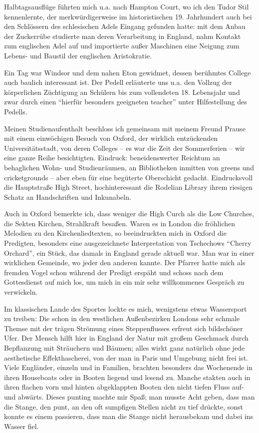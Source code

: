 \documentclass[a5paper,pagesize,10pt,twoside=true]{scrbook}
\begin{document}
Halbtagsausflüge führten mich u.a. nach Hampton Court, wo ich den Tudor Stil kennenlernte, der merkwürdigerweise im historistischen 19. Jahrhundert auch bei den Schlössern des schlesischen Adels Eingang gefunden hatte: mit dem Anbau der Zuckerrübe studierte man deren Verarbeitung in England, nahm Kontakt zum englischen Adel auf und importierte außer Maschinen eine Neigung zum Lebens- und Baustil der englischen Aristokratie.

Ein Tag war Windsor und dem nahen Eton gewidmet, dessen berühmtes College auch baulich interessant ist. Der Pedell erläuterte uns u.a. den Vollzug der körperlichen Züchtigung an Schülern bis zum vollendeten 18. Lebensjahr und zwar durch einen \enquote{hierfür besonders geeigneten teacher} unter Hilfestellung des Pedells.

Meinen Studienaufenthalt beschloss ich gemeinsam mit meinem Freund Prause mit einem einwöchigen Besuch von Oxford, der wirklich entzückenden Universitätsstadt, von deren Colleges -- es war die Zeit der Sommerferien -- wir eine ganze Reihe besichtigten. Eindruck: beneidenswerter Reichtum an behaglichen Wohn- und Studienräumen, an Bibliotheken inmitten von greens und cricketgrounds -- aber eben für eine begüterte Oberschicht gedacht. Eindrucksvoll die Hauptstraße High Street, hochinteressant die Rodelian Library ihrem riesigen Schatz an Handschriften und Inkunabeln.

Auch in Oxford bemerkte ich, dass weniger die High Curch als die Low Churches, die Sekten Kirchen, Strahlkraft besaßen. Waren es in London die fröhlichen Melodien zu den Kirchenliedtexten, so beeindruckten mich in Oxford die Predigten, besonders eine ausgezeichnete Interpretation von Tschechows \enquote{Cherry Orchard}, ein Stück, das damals in England gerade aktuell war. Man war in einer wirklichen Gemeinde, wo jeder den anderen kannte. Der Pfarrer hatte mich als fremden Vogel schon während der Predigt erspäht und schoss nach dem Gottesdienst auf mich los, um mich in ein mir sehr willkommenes Gespräch zu verwickeln.

Im klassischen Lande des Sportes lockte es mich, wenigstens etwas Wassersport zu treiben: Die schon in den westlichen Außenbezirken Londons sehr schmale Themse mit der trägen Strömung eines Steppenflusses erfreut sich bildschöner Ufer. Der Mensch hilft hier in England der Natur mit großem Geschmack durch Bepflanzung mit Sträuchern und Bäumen; alles wirkt ganz natürlich ohne jede aesthetische Effekthascherei, von der man in Paris und Umgebung nicht frei ist. Viele Engländer, einzeln und in Familien, brachten besonders das Wochenende in ihren Houseboats oder in Booten liegend und lesend zu. Manche stakten auch in ihren flachen vorn und hinten abgeklappten Booten den nicht tiefen Fluss auf- und abwärts. Dieses punting machte mir Spaß; man musste Acht geben, dass man die Stange, den punt, an den oft sumpfigen Stellen nicht zu tief drückte, sonst konnte es einem passieren, dass man die Stange nicht herausbekam und dabei ins Wasser fiel.
\end{document}
